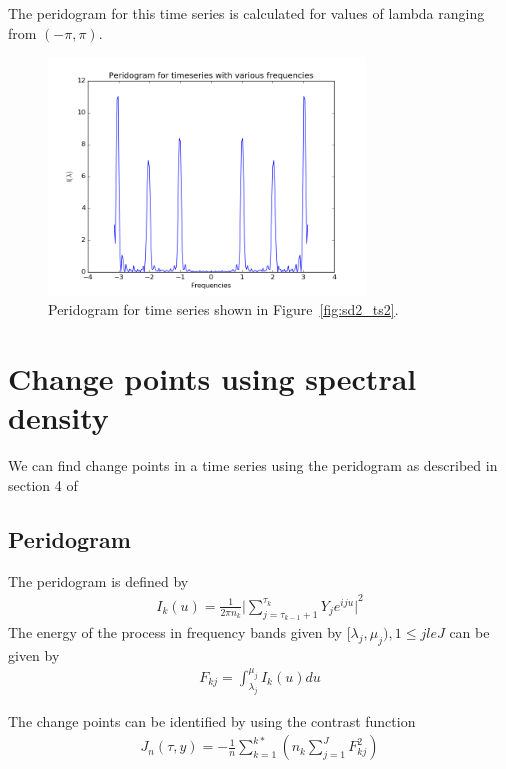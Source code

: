 \documentclass{article}
\begin{document}
The peridogram for this time series is calculated for values of lambda ranging from $(-\pi, \pi)$.

\begin{figure}[ht!]
  \centering
  \includegraphics[width=0.75\textwidth]{images/spectral_density_2/peri2}
  \caption{Peridogram for time series shown in Figure~\ref{fig:sd2_ts2}.\label{fig:sd2_peri2}}
\end{figure}

\section{Change points using spectral density}
We can find change points in a time series using the peridogram as described in section 4 of~\cite{lavielle2005using}

\subsection{Peridogram}
The peridogram is defined by 
\begin{align}
  I_{k}(u) = \frac{1}{2\pi n_{k}} {\lvert \sum_{j = \tau_{k-1}+1}^{\tau_{k}} Y_{j} e^{iju} \rvert }^{2}
\end{align}
The energy of the process in frequency bands given by $[\lambda_{j}, \mu_{j}), 1 \le j le J $ can be given by 
\begin{align}
  F_{kj} = \int_{\lambda_{j}}^{\mu_{j}} I_{k}(u) du
\end{align}

The change points can be identified by using the contrast function
\begin{align}
  J_{n}(\tau, y) = -\frac{1}{n} \sum_{k=1}^{k*} (n_{k} \sum_{j=1}^{J} F^{2}_{kj})
\end{align}



\end{document}
